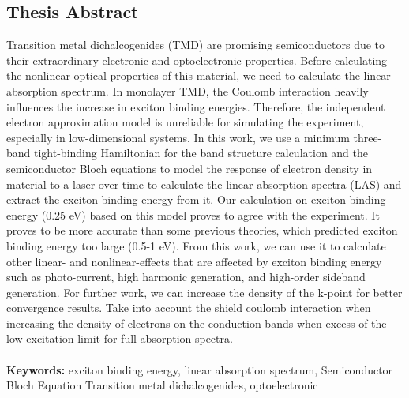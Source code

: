 \documentclass[12pt,english,a4paper]{article}
\begin{document}
	\subsection*{Thesis Abstract}
	\quad Transition metal dichalcogenides (TMD) are promising semiconductors due to their extraordinary electronic and optoelectronic properties. Before calculating the nonlinear optical properties of this material, we need to calculate the linear absorption spectrum. In monolayer TMD, the Coulomb interaction heavily influences the increase in exciton binding energies. Therefore, the independent electron approximation model is unreliable for simulating the experiment, especially in low-dimensional systems. In this work, we use a minimum three-band tight-binding Hamiltonian for the band structure calculation and the semiconductor Bloch equations to model the response of electron density in material to a laser over time to calculate the linear absorption spectra (LAS) and extract the exciton binding energy from it. Our calculation on exciton binding energy (0.25 eV) based on this model proves to agree with the experiment. It proves to be more accurate than some previous theories, which predicted exciton binding energy too large (0.5-1 eV). From this work, we can use it to calculate other linear- and nonlinear-effects that are affected by exciton binding energy such as photo-current, high harmonic generation, and high-order sideband generation. For further work, we can increase the density of the k-point for better convergence results. Take into account the shield coulomb interaction when increasing the density of electrons on the conduction bands when excess of the low excitation limit for full absorption spectra.\\\null
	\\[1cm]
	\textbf{Keywords:} exciton binding energy, linear absorption spectrum, Semiconductor Bloch Equation Transition metal dichalcogenides, optoelectronic
\end{document}
